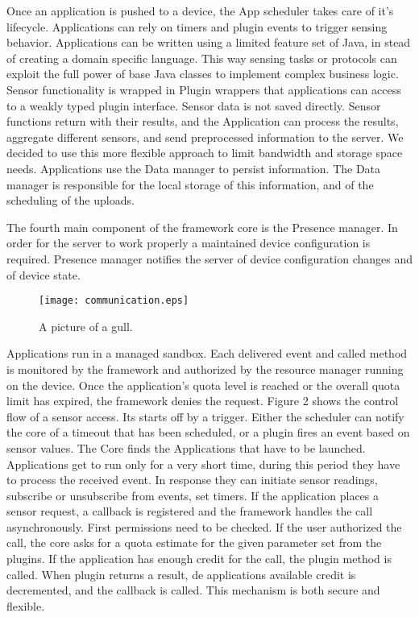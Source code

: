 \documentclass[conference,letterpaper]{IEEEtran}
\begin{document}
Once an application is pushed to a device, the App scheduler takes care of it's lifecycle. Applications can rely on timers and plugin events to trigger sensing behavior. Applications can be written using a limited feature set of Java, in stead of creating a domain specific language. This way sensing tasks or protocols can exploit the full power of base Java classes to implement complex business logic. Sensor functionality is wrapped in Plugin wrappers that applications can access to a weakly typed plugin interface. Sensor data is not saved directly. Sensor functions return with their results, and the Application can process the results, aggregate different sensors, and send preprocessed information to the server. We decided to use this more flexible approach to limit bandwidth and storage space needs. Applications use the Data manager to persist information. The Data manager is responsible for the local storage of this information, and of the scheduling of the uploads.

The fourth main component of the framework core is the Presence manager. In order for the server to work properly a maintained device configuration is required. Presence manager notifies the server of device configuration changes and of device state.

\begin{figure}[h]
\caption{A picture of a gull.}
\centering
	\texttt{[image: communication.eps]}
\end{figure}

Applications run in a managed sandbox. Each delivered event and called method is monitored by the framework and authorized by the resource manager running on the device. Once the application's quota level is reached or the overall quota limit has expired, the framework denies the request. Figure 2 shows the control flow of a sensor access. Its starts off by a trigger. Either the scheduler can notify the core of a timeout that has been scheduled, or a plugin fires an event based on sensor values. The Core finds the Applications that have to be launched. Applications get to run only for a very short time, during this period they have to process the received event. In response they can initiate sensor readings, subscribe or unsubscribe from events, set timers. If the application places a sensor request, a callback is registered and the framework handles the call asynchronously. First permissions need to be checked. If the user authorized the call, the core asks for a quota estimate for the given parameter set from the plugins. If the application has enough credit for the call, the plugin method is called. When plugin returns a result, de applications available credit is decremented, and the callback is called. This mechanism is both secure and flexible.
\end{document}
